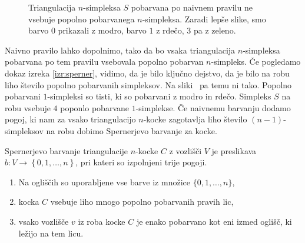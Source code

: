 \documentclass[mat1]{fmfdelo}
\newcommand{\0}{\underline{0}}
\begin{document}
\begin{figure}[h!]
	\centering
	\caption{Triangulacija $n$-simpleksa $S$ pobarvana po naivnem pravilu ne vsebuje popolno pobarvanega $n$-simpleksa. Zaradi lepše slike, smo barvo $0$ prikazali z modro, barvo $1$ z rdečo, $3$ pa z zeleno.}\label{fig:ni-pop}
\end{figure}
Naivno pravilo lahko dopolnimo, tako da bo vsaka triangulacija $n$-simpleksa pobarvana po tem pravilu vsebovala popolno pobarvan $n$-simpleks. Če pogledamo dokaz izreka \ref{izr:sperner}, vidimo, da je bilo ključno dejstvo, da je bilo na robu liho število popolno pobarvanih simpleksov. Na sliki~\label{fig:ni-pop} pa temu ni tako. Popolno pobarvani $1$-simpleksi so tisti, ki so pobarvani z modro in rdečo. Simpleks $S$ na robu vsebuje $4$ poponlo pobarvane $1$-simplekse. Če naivnemu barvanju dodamo pogoj, ki nam za vsako triangulacijo $n$-kocke zagotavlja liho število $(n-1)$-simpleksov na robu dobimo Spernerjevo barvanje za kocke.
\begin{definicija}\label{def:cubsperner}
Spernerjevo barvanje triangulacije $n$-kocke $C$ z vozlišči $V$ je preslikava $b : V \to \left \{ 0, 1, \dots, n \right \}$, pri kateri so izpolnjeni trije pogoji.
\begin{enumerate}
\item Na ogliščih so uporabljene vse barve iz množice $\{ 0, 1, \dots, n \}$,
\item kocka $C$ vsebuje liho mnogo popolno pobarvanih pravih lic,
\item vsako vozlišče $v$ iz roba kocke $C$ je enako pobarvano kot eni izmed oglišč, ki ležijo na tem licu.
\end{enumerate}
\end{definicija}
\end{document}
